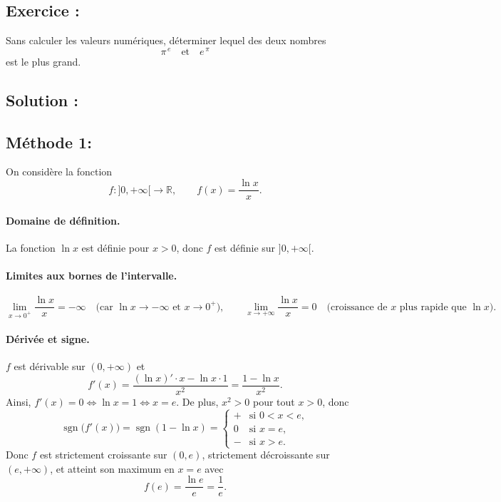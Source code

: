 \subsection*{Exercice :}

\begin{exerciseBox}[Comparaison de $\pi^e$ et $e^\pi$]
Sans calculer les valeurs numériques, déterminer lequel des deux nombres
\[
\pi^{\,e} \quad \text{et} \quad e^{\,\pi}
\]
est le plus grand.
\end{exerciseBox}

\subsection*{Solution :}


\subsection*{Méthode 1:}

On considère la fonction
\[
f : ]0,+\infty[ \to \mathbb{R},\qquad f(x)=\frac{\ln x}{x}.
\]

\paragraph{Domaine de définition.}
La fonction $\ln x$ est définie pour $x>0$, donc $f$ est définie sur $]0,+\infty[$.

\paragraph{Limites aux bornes de l'intervalle.}
\[
\lim_{x\to 0^+} \frac{\ln x}{x} = -\infty
\quad\text{(car $\ln x\to -\infty$ et $x\to 0^+$)},
\qquad
\lim_{x\to +\infty} \frac{\ln x}{x} = 0
\quad\text{(croissance de $x$ plus rapide que $\ln x$)}.
\]

\paragraph{Dérivée et signe.}
$f$ est dérivable sur $(0,+\infty)$ et
\[
f'(x)=\frac{(\ln x)' \cdot x - \ln x \cdot 1}{x^2}
= \frac{1 - \ln x}{x^2}.
\]
Ainsi, $f'(x)=0 \iff \ln x = 1 \iff x=e$. De plus, $x^2>0$ pour tout $x>0$, donc
\[
\operatorname{sgn}\big(f'(x)\big)=\operatorname{sgn}(1-\ln x)=
\begin{cases}
+ & \text{si } 0<x<e,\\
0 & \text{si } x=e,\\
- & \text{si } x>e.
\end{cases}
\]
Donc $f$ est strictement croissante sur $(0,e)$, strictement décroissante sur $(e,+\infty)$, et atteint son maximum en $x=e$ avec
\[
f(e)=\frac{\ln e}{e}=\frac{1}{e}.
\]

